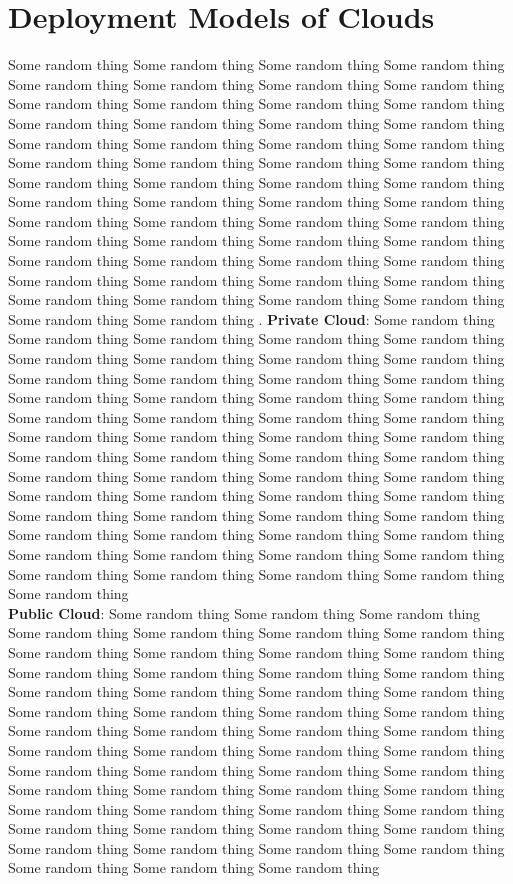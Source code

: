 \section{Deployment Models of Clouds} 
Some random thing Some random thing Some random thing Some random thing Some random thing Some random thing Some random thing Some random thing Some random thing Some random thing Some random thing Some random thing Some random thing Some random thing Some random thing Some random thing Some random thing Some random thing Some random thing Some random thing Some random thing Some random thing Some random thing Some random thing Some random thing Some random thing Some random thing Some random thing Some random thing Some random thing Some random thing Some random thing Some random thing Some random thing Some random thing Some random thing Some random thing Some random thing Some random thing Some random thing Some random thing Some random thing Some random thing Some random thing Some random thing Some random thing Some random thing Some random thing Some random thing Some random thing Some random thing Some random thing Some random thing Some random thing .\newline 
\textbf{Private Cloud}: Some random thing Some random thing Some random thing Some random thing Some random thing Some random thing Some random thing Some random thing Some random thing Some random thing Some random thing Some random thing Some random thing Some random thing Some random thing Some random thing Some random thing Some random thing Some random thing Some random thing Some random thing Some random thing Some random thing Some random thing Some random thing Some random thing Some random thing Some random thing Some random thing Some random thing Some random thing Some random thing Some random thing Some random thing Some random thing Some random thing Some random thing Some random thing Some random thing Some random thing Some random thing Some random thing Some random thing Some random thing Some random thing Some random thing Some random thing Some random thing Some random thing Some random thing Some random thing Some random thing Some random thing Some random thing \\ 
\textbf{Public Cloud}: Some random thing Some random thing Some random thing Some random thing Some random thing Some random thing Some random thing Some random thing Some random thing Some random thing Some random thing Some random thing Some random thing Some random thing Some random thing Some random thing Some random thing Some random thing Some random thing Some random thing Some random thing Some random thing Some random thing Some random thing Some random thing Some random thing Some random thing Some random thing Some random thing Some random thing Some random thing Some random thing Some random thing Some random thing Some random thing Some random thing Some random thing Some random thing Some random thing Some random thing Some random thing Some random thing Some random thing Some random thing Some random thing Some random thing Some random thing Some random thing Some random thing Some random thing Some random thing Some random thing Some random thing Some random thing  \\
